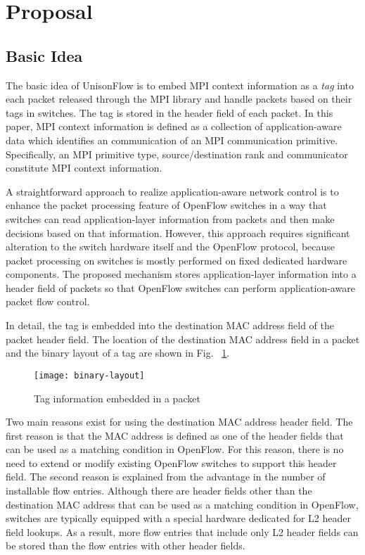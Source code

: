 \hypertarget{proposal}{%
\section{Proposal}\label{proposal}}

\hypertarget{basic-idea}{%
\subsection{Basic Idea}\label{basic-idea}}

The basic idea of UnisonFlow is to embed MPI context information as a
\emph{tag} into each packet released through the MPI library and handle
packets based on their tags in switches. The tag is stored in the header
field of each packet. In this paper, MPI context information is defined
as a collection of application-aware data which identifies an
communication of an MPI communication primitive. Specifically, an MPI
primitive type, source/destination rank and communicator constitute MPI
context information.

A straightforward approach to realize application-aware network control
is to enhance the packet processing feature of OpenFlow switches in a
way that switches can read application-layer information from packets
and then make decisions based on that information. However, this
approach requires significant alteration to the switch hardware itself
and the OpenFlow protocol, because packet processing on switches is
mostly performed on fixed dedicated hardware components. The proposed
mechanism stores application-layer information into a header field of
packets so that OpenFlow switches can perform application-aware packet
flow control.

In detail, the tag is embedded into the destination MAC address field of
the packet header field. The location of the destination MAC address
field in a packet and the binary layout of a tag are shown in Fig.
~\ref{fig:binary-layout}.

\begin{figure}[htbp]
    \centering
    \texttt{[image: binary-layout]}
    \caption{Tag information embedded in a packet}
    \label{fig:binary-layout}
\end{figure}

Two main reasons exist for using the destination MAC address header
field. The first reason is that the MAC address is defined as one of the
header fields that can be used as a matching condition in OpenFlow. For
this reason, there is no need to extend or modify existing OpenFlow
switches to support this header field. The second reason is explained
from the advantage in the number of installable flow entries. Although
there are header fields other than the destination MAC address that can
be used as a matching condition in OpenFlow, switches are typically
equipped with a special hardware dedicated for L2 header field lookups.
As a result, more flow entries that include only L2 header fields can be
stored than the flow entries with other header fields.

